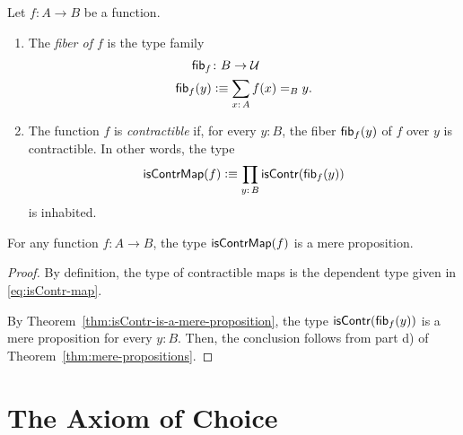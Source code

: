 \begin{defns}\label{defn:fiber-over-y}
    Let $f\colon A\to B$ be a function.
    \begin{enumerate}[-]
        \item The \textsl{fiber of $f$} is the type family
        \begin{align*}
            \fun{fib}_f&\colon B\to\univ\\
            \fun{fib}_f(y)&\defeq\sum_{x\colon A}f(x)\eq By.
        \end{align*}
            
        \item The function $f$ is \textsl{contractible} if, for every $y\colon B$, the fiber $\mathsf{fib}_f(y)$ of $f$ over $y$ is contractible. In other words, the type
        \begin{equation}\label{eq:isContr-map}
            \fun{isContrMap}(f)
                \defeq\prod_{y\colon B}\fun{isContr}(\fun{fib}_f(y))
        \end{equation}
        is inhabited.
    \end{enumerate}
\end{defns}

\begin{lem}
    For any function\/ $f\colon A\to B$, the type\/ $\mathsf{isContrMap}(f)$ is a mere proposition.
\end{lem}

\begin{proof}
    By definition, the type of contractible maps is the dependent type given in \eqref{eq:isContr-map}.

    By Theorem~\ref{thm:isContr-is-a-mere-proposition}, the type $\mathsf{isContr}(\mathsf{fib}_f(y))$ is a mere proposition for every $y\colon B$. Then, the conclusion follows from part d) of Theorem~\ref{thm:mere-propositions}.
    
\end{proof}


\section{The Axiom of Choice}


